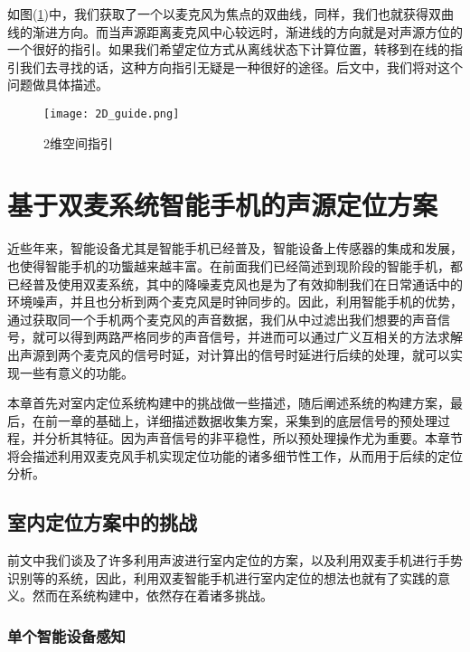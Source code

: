 \documentclass[winfonts,oneside]{njuthesis}
\begin{document}
		如图(\ref{fig: 2D_guide})中，我们获取了一个以麦克风为焦点的双曲线，同样，我们也就获得双曲线的渐进方向。而当声源距离麦克风中心较远时，渐进线的方向就是对声源方位的一个很好的指引。如果我们希望定位方式从离线状态下计算位置，转移到在线的指引我们去寻找的话，这种方向指引无疑是一种很好的途径。后文中，我们将对这个问题做具体描述。
		
		\begin{figure}[H]
			\centering
			\texttt{[image: 2D\_guide.png]} 
			\caption{2维空间指引}
			\label{fig: 2D_guide}
		\end{figure}
	
\chapter{基于双麦系统智能手机的声源定位方案}\label{chapter_work}
	
	近些年来，智能设备尤其是智能手机已经普及，智能设备上传感器的集成和发展，也使得智能手机的功螚越来越丰富。在前面我们已经简述到现阶段的智能手机，都已经普及使用双麦系统，其中的降噪麦克风也是为了有效抑制我们在日常通话中的环境噪声，并且也分析到两个麦克风是时钟同步的。因此，利用智能手机的优势，通过获取同一个手机两个麦克风的声音数据，我们从中过滤出我们想要的声音信号，就可以得到两路严格同步的声音信号，并进而可以通过广义互相关的方法求解出声源到两个麦克风的信号时延，对计算出的信号时延进行后续的处理，就可以实现一些有意义的功能\cite{zhouxin}。
	

	本章首先对室内定位系统构建中的挑战做一些描述，随后阐述系统的构建方案，最后，在前一章的基础上，详细描述数据收集方案，采集到的底层信号的预处理过程，并分析其特征。因为声音信号的非平稳性，所以预处理操作尤为重要。本章节将会描述利用双麦克风手机实现定位功能的诸多细节性工作，从而用于后续的定位分析。
	
	\section{室内定位方案中的挑战}
		
		前文中我们谈及了许多利用声波进行室内定位的方案，以及利用双麦手机进行手势识别等的系统，因此，利用双麦智能手机进行室内定位的想法也就有了实践的意义。然而在系统构建中，依然存在着诸多挑战。
		
		\subsection{单个智能设备感知}
		
\end{document}
